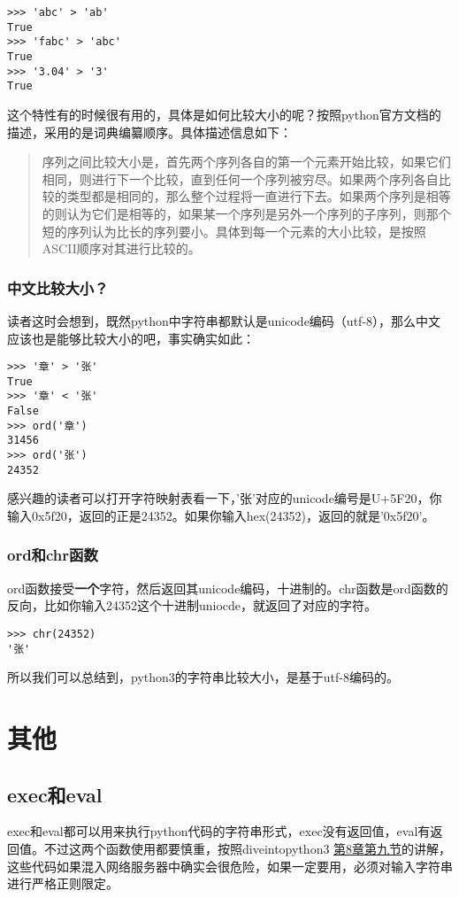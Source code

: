 \documentclass[12pt,oneside]{book}
\begin{document}
\begin{common-format}
\begin{Verbatim}
>>> 'abc' > 'ab'
True
>>> 'fabc' > 'abc'
True
>>> '3.04' > '3'
True
\end{Verbatim}

这个特性有的时候很有用的，具体是如何比较大小的呢？按照python官方文档的描述，采用的是词典编纂顺序。具体描述信息如下：

\begin{quotation}
序列之间比较大小是，首先两个序列各自的第一个元素开始比较，如果它们相同，则进行下一个比较，直到任何一个序列被穷尽。如果两个序列各自比较的类型都是相同的，那么整个过程将一直进行下去。如果两个序列是相等的则认为它们是相等的，如果某一个序列是另外一个序列的子序列，则那个短的序列认为比长的序列要小。具体到每一个元素的大小比较，是按照ASCII顺序对其进行比较的。
\end{quotation}

\subsection{中文比较大小？}
读者这时会想到，既然python中字符串都默认是unicode编码（utf-8），那么中文应该也是能够比较大小的吧，事实确实如此：

\begin{Verbatim}
>>> '章' > '张'
True
>>> '章' < '张'
False
>>> ord('章')
31456
>>> ord('张')
24352
\end{Verbatim}

感兴趣的读者可以打开字符映射表看一下，'张'对应的unicode编号是U+5F20，你输入0x5f20，返回的正是24352。如果你输入hex(24352)，返回的就是'0x5f20'。


\subsection{ord和chr函数}
ord函数接受\textbf{一个}字符，然后返回其unicode编码，十进制的。chr函数是ord函数的反向，比如你输入24352这个十进制uniocde，就返回了对应的字符。
\begin{Verbatim}
>>> chr(24352)
'张'
\end{Verbatim}

所以我们可以总结到，python3的字符串比较大小，是基于utf-8编码的。



\chapter{其他}
\section{exec和eval}
exec和eval都可以用来执行python代码的字符串形式，exec没有返回值，eval有返回值。不过这两个函数使用都要慎重，按照diveintopython3 \href{http://www.diveintopython3.net/advanced-iterators.html}{第8章第九节}的讲解，这些代码如果混入网络服务器中确实会很危险，如果一定要用，必须对输入字符串进行严格正则限定。


\end{common-format}
\end{document}
